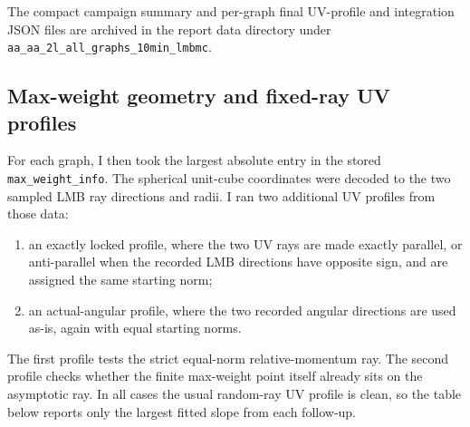 \documentclass[11pt]{article}
\begin{document}
The compact campaign summary and per-graph final UV-profile and integration
JSON files are archived in the report data directory under
\texttt{aa\_aa\_2l\_all\_graphs\_10min\_lmbmc}.

\subsection{Max-weight geometry and fixed-ray UV profiles}

For each graph, I then took the largest absolute entry in the stored
\texttt{max\_weight\_info}.  The spherical unit-cube coordinates were decoded
to the two sampled LMB ray directions and radii.  I ran two additional UV
profiles from those data:
\begin{enumerate}
  \item an exactly locked profile, where the two UV rays are made exactly
        parallel, or anti-parallel when the recorded LMB directions have
        opposite sign, and are assigned the same starting norm;
  \item an actual-angular profile, where the two recorded angular directions
        are used as-is, again with equal starting norms.
\end{enumerate}
The first profile tests the strict equal-norm relative-momentum ray.  The
second profile checks whether the finite max-weight point itself already sits
on the asymptotic ray.  In all cases the usual random-ray UV profile is clean,
so the table below reports only the largest fitted slope from each follow-up.
\end{document}
